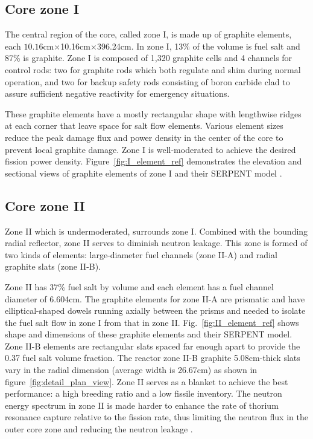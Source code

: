 \subsection{Core zone I}
The central region of the core, called zone I, is made up of graphite elements, each $10.16$cm$\times$10.16cm$\times$396.24cm. In zone I, 13\% of the volume is fuel salt and 87\% is graphite. Zone I is composed of 1,320 graphite cells and 4 channels for control rods: two for graphite rods which both regulate and shim during normal operation, and two for backup safety rods consisting of boron carbide clad to assure sufficient negative reactivity for emergency situations.

These graphite elements have a mostly rectangular shape with lengthwise ridges at each corner that leave space for salt flow elements. Various element sizes reduce the peak damage flux and power density in the center of the core to prevent local graphite damage. Zone I is well-moderated to achieve the desired fission power density. Figure~\ref{fig:I_element_ref} demonstrates the elevation and sectional views of graphite elements of zone I \cite{robertson_conceptual_1971} and their SERPENT model \cite{rykhlevskii_full-core_2017}.

\subsection{Core zone II}
Zone II which is undermoderated, surrounds zone I. Combined with the bounding radial reflector, zone II serves to diminish neutron leakage. This zone is formed of two kinds of elements: large-diameter fuel channels (zone II-A) and radial graphite slats (zone II-B). 

Zone II has 37\% fuel salt by volume and each element has a fuel channel diameter of 6.604cm. The graphite elements for zone II-A are prismatic and have elliptical-shaped dowels running axially between the prisms and needed to isolate the fuel salt flow in zone I from that in zone II. Fig.~\ref{fig:II_element_ref} shows shape and dimensions of these graphite elements and their SERPENT model. Zone II-B elements are rectangular slats spaced far enough apart to provide the 0.37 fuel salt volume fraction. The reactor zone II-B graphite 5.08cm-thick slats vary in the radial dimension (average width is 26.67cm) as shown in figure~\ref{fig:detail_plan_view}. Zone II serves as a blanket to achieve the best performance: a high breeding ratio and a low fissile inventory. The neutron energy spectrum in zone II is made harder to enhance the rate of thorium resonance capture relative to the fission rate, thus limiting the neutron flux in the outer core zone and reducing the neutron leakage \cite{robertson_conceptual_1971}. 

